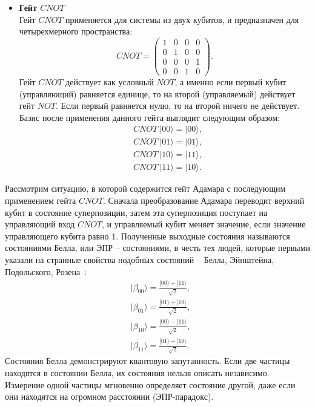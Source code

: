 \documentclass[12pt,a4paper]{article}
\begin{document}
\begin{itemize}
		\item \textbf{Гейт $CNOT$} \\
		Гейт $CNOT$ применяется для системы из двух кубитов, и
		предназначен для четырехмерного пространства:
		\begin{equation}
			CNOT = 
			\begin{pmatrix}
				1 & 0 & 0 & 0 \\
				0 & 1 & 0 & 0 \\
				0 & 0 & 0 & 1 \\
				0 & 0 & 1 & 0 
			\end{pmatrix}.
		\end{equation}
		Гейт $CNOT$ действует как условный $NOT$, а именно если первый кубит (управляющий) равняется единице, то на второй (управляемый) действует гейт $NOT$. Если первый равняется нулю, то на второй ничего не действует. Базис после применения данного гейта выглядит следующим образом:
		\begin{equation}
			\begin{split}
				&CNOT~|00\rangle = |00\rangle, \\
				&CNOT~|01\rangle = |01\rangle, \\	
				&CNOT~|10\rangle = |11\rangle, \\
				&CNOT~|11\rangle = |10\rangle.
			\end{split}
		\end{equation}
	\end{itemize}
	Рассмотрим ситуацию, в которой содержится гейт Адамара с последующим применением гейта $CNOT$. Сначала преобразование Адамара переводит верхний кубит в состояние суперпозиции, затем эта суперпозиция поступает на управляющий вход $CNOT$, и управляемый кубит меняет значение, если значение управляющего кубита равно 1. Полученные выходные состояния называются состояниями Белла, или ЭПР -- состояниями, в честь тех людей, которые первыми указали на странные свойства подобных состояний -- Белла, Эйнштейна, Подольского, Розена~\cite{1}:
	\begin{equation}
		\begin{split}
			&|\beta_{00} \rangle = \frac{|00 \rangle + |11\rangle}{\sqrt{2}}, \\
			&|\beta_{01} \rangle = \frac{|01 \rangle + |10\rangle}{\sqrt{2}}, \\
			&|\beta_{10} \rangle = \frac{|00 \rangle - |11\rangle}{\sqrt{2}}, \\
			&|\beta_{11} \rangle = \frac{|01 \rangle - |10\rangle}{\sqrt{2}}.
		\end{split}
	\end{equation}
	Состояния Белла демонстрируют квантовую запутанность. Если две частицы находятся в состоянии Белла, их состояния нельзя описать независимо. Измерение одной частицы мгновенно определяет состояние другой, даже если они находятся на огромном расстоянии (ЭПР-парадокс).
\end{document}
